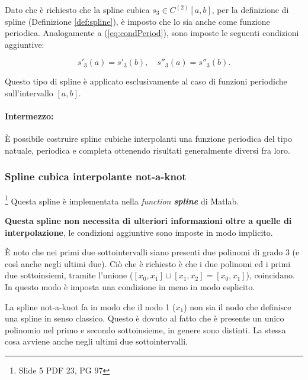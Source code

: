 Dato che è richiesto che la spline cubica $s_3\in C^{(2)}[a,b]$, per la definizione di spline (Definizione \ref{def:spline}), è imposto che lo sia anche come funzione periodica. Analogamente a (\ref{eq:condPeriod}), sono imposte le seguenti condizioni aggiuntive:

\begin{equation}\label{eq:condSplineCubPer}
    \boxed{s'_3(a)=s'_3(b),\quad s''_3(a)=s''_3(b).}
\end{equation}

\begin{remark}
    Questo tipo di spline è applicato esclusivamente al caso di funzioni periodiche sull'intervallo $[a,b]$.
\end{remark}

\paragraph{Intermezzo:}È possibile costruire spline cubiche interpolanti una funzione periodica  del tipo natuale, periodica e completa ottenendo risultati generalmente diversi fra loro.

\subsubsection{Spline cubica interpolante not-a-knot}
\begin{remark}\footnote{Slide 5 PDF 23, PG 97}
    Questa spline è implementata nella \textit{function \textbf{spline}} di Matlab.
\end{remark}

\textbf{Questa spline non necessita di ulteriori informazioni oltre a quelle di interpolazione}, le condizioni aggiuntive sono  imposte in modo implicito. 

È noto che nei primi due sottointervalli siano presenti due polinomi di grado 3 (e così anche negli ultimi due). Ciò che è richiesto è che i due polinomi ed i primi due sottoinsiemi, tramite l'unione ($[x_0,x_1]\cup[x_1,x_2]=[x_0,x_1]$), coincidano. In questo modo è imposta una condizione in meno in modo esplicito. 

La spline not-a-knot fa in modo che il nodo 1 ($x_1$) non sia il nodo che definisce una spline in senso classico. Questo è dovuto al fatto che è presente un unico polinomio nel primo e secondo sottoinsieme, in genere sono distinti. La stessa cosa avviene anche negli ultimi due sottointervalli.

